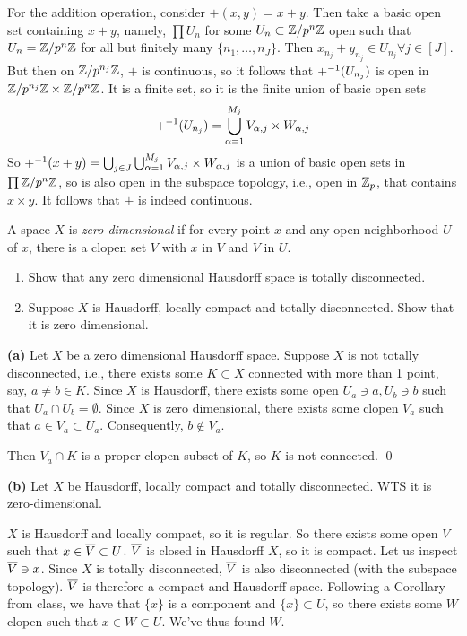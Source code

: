 \documentclass[a4paper, 10pt]{article}
\begin{document}
\begin{solution}
    For the addition operation, consider $+(x, y) = x+y$. Then take a basic open set containing $x+y$, namely, $\prod U_n$ for some $U_n \subset \mathbb{Z}/p^n \mathbb{Z}$ open such that  $U_n = \mathbb{Z}/p^n \mathbb{Z}$ for all but finitely many $\{n_1, \ldots, n_J\}$. Then $x_{n_j} + y_{n_j} \in U_{n_j} \forall j \in [J]$. But then on $\mathbb{Z} / p^{n_j} \mathbb{Z}$, $+$ is continuous, so it follows that ${+}^{-1}(U_{n_j})$ is open in $\mathbb{Z} / p^{n_j} \mathbb{Z} \times \mathbb{Z} / p^n \mathbb{Z}$. It is a finite set, so it is the finite union of basic open sets \begin{equation*}
    {+}^{-1}(U_{n_j}) = \bigcup_{\alpha = 1}^{M_j} V_{\alpha, j} \times W_{\alpha, j}
    \end{equation*}
    So ${+}^{-1}(x + y) = \bigcup_{j \in J} \bigcup_{\alpha = 1}^{M_j} V_{\alpha, j} \times W_{\alpha, j}$ is a union of basic open sets in $\prod \mathbb{Z} /p^n \mathbb{Z}$, so is also open in the subspace topology, i.e., open in $\mathbb{Z}_p$, that contains $x \times y$. It follows that $+$ is indeed continuous.

\end{solution}

\begin{problem}  [\done]
    A space $X$ is \textit{zero-dimensional} if for every point $x$ and any open neighborhood $U$ of $x$, there is a clopen set $V$ with $x$ in $V$ and $V$ in $U$.
    \begin{enumerate}
    \item Show that any zero dimensional Hausdorff space is totally disconnected.
    \item Suppose $X$ is Hausdorff, locally compact and totally disconnected. Show that it is zero dimensional.
    \end{enumerate}
\end{problem}
\begin{solution}
    \textbf{(a)} Let $X$ be a zero dimensional Hausdorff space. Suppose $X$ is not totally disconnected, i.e., there exists some $K \subset X$ connected with more than 1 point, say, $a \neq b \in K$. Since $X$ is Hausdorff, there exists some open $U_a \ni a, U_b \ni b$ such that $U_a \cap U_b = \emptyset$. Since $X$ is zero dimensional, there exists some clopen $V_a$ such that $a \in V_a \subset U_a$. Consequently, $b \not \in V_a$.
    
    Then $V_a \cap K$ is a proper clopen subset of $K$, so $K$ is not connected. \contra \qed

    \textbf{(b)} Let $X$ be Hausdorff, locally compact and totally disconnected. WTS it is zero-dimensional. 

    $X$ is Hausdorff and locally compact, so it is regular. So there exists some open $V$ such that $x \in \overline{V} \subset U$. $\overline{V}$ is closed in Hausdorff $X$, so it is compact. Let us inspect $\overline{V} \ni x$. Since $X$ is totally disconnected, $\overline{V}$ is also disconnected (with the subspace topology). $\overline{V}$ is therefore a compact and Hausdorff space. Following a Corollary from class, we have that $\{x\}$ is a component and $\{x\} \subset U$, so there exists some $W$ clopen such that $x \in W \subset U$.  We've thus found $W$.
\end{solution}
\end{document}

